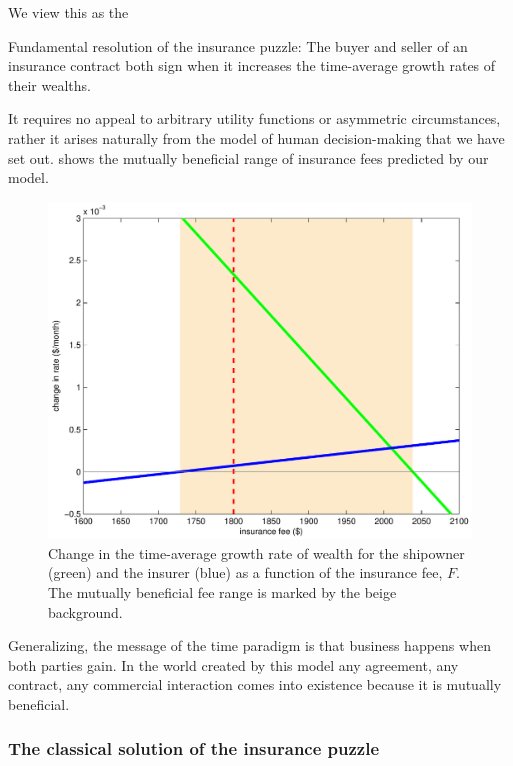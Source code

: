 We view this as the
\begin{keypts}{Fundamental resolution of the insurance puzzle:}
The buyer and seller of an insurance contract both sign when it increases the time-average growth rates of their wealths.
\end{keypts}
It requires no appeal to arbitrary utility functions or asymmetric circumstances, rather it arises naturally from the model of human decision-making that we have set out.  shows the mutually beneficial range of insurance fees predicted by our model.
\begin{figure}
\centering
\includegraphics[width=\textwidth]{./chapter_2/figs/ins_log_cropped.pdf}
\caption{Change in the time-average growth rate of wealth for the shipowner (green) and the insurer (blue) as a function of the insurance fee, $F$. The mutually beneficial fee range is marked by the beige background.}
\end{figure}
Generalizing, the message of the time paradigm is that business happens when both parties gain.
In the world created by this model any agreement, any contract, any commercial interaction 
comes into existence because it is mutually beneficial.

\subsubsection{The classical solution of the insurance puzzle}

